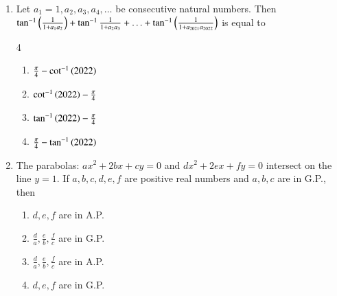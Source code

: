 \documentclass[journal,9pt,onecolumn]{IEEEtran}
\begin{document}
\begin{enumerate}
\item Let $a_1 = 1,a_2,a_3,a_4,\ldots$ be consecutive natural numbers. Then $\tan ^{-1}\left(\frac{1}{1 + a_1a_2}\right) + \tan ^{-1} \frac{1}{1 + a_2a_3} + \ldots + \tan ^{-1} \left(\frac{1}{1 + a_{2021}a_{2022}}\right)$ is equal to
\begin {multicols}{4}
\begin{enumerate}
    \item $\frac{\pi}{4} - \cot ^{-1}\left(2022\right)$ 
    \item $\cot ^{-1}\left(2022\right) - \frac{\pi}{4}$ 
    \item $\tan ^{-1} \left(2022\right) - \frac{\pi}{4}$ 
    \item $\frac{\pi}{4} - \tan ^{-1}\left(2022\right)$ 
\end{enumerate}
\end{multicols}

\item The parabolas: $a x^2 + 2 b x + c y = 0 $ and $d x^2 + 2 e x + f y = 0$ intersect on the line $y = 1$. If $a, b, c, d, e, f$ are positive real numbers and $a, b, c$ are in G.P., then 
\begin{multicols}{4}
\begin{enumerate}
    \item $d, e, f$ are in A.P.
    \item $\frac{d}{a}, \frac{e}{b}, \frac{f}{c}$ are in G.P.
    \item $\frac{d}{a}, \frac{e}{b}, \frac{f}{c}$ are in A.P.
    \item $d, e, f$ are in G.P.
\end{enumerate}
\end{multicols} 
\end{enumerate}
\end{document}
